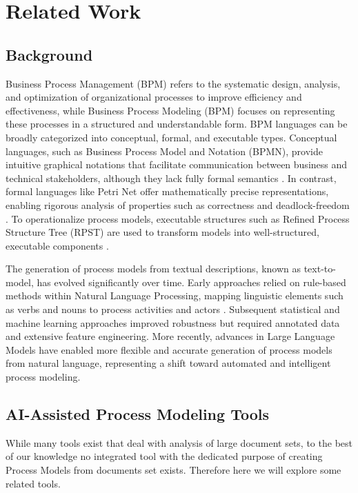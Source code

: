 \chapter{Related Work}
\label{sec:rel}
\section{Background}
Business Process Management (BPM) refers to the systematic design, analysis, and optimization of organizational processes to improve efficiency and effectiveness, while Business Process Modeling (BPM) focuses on representing these processes in a structured and understandable form. BPM languages can be broadly categorized into conceptual, formal, and executable types. Conceptual languages, such as Business Process Model and Notation (BPMN), provide intuitive graphical notations that facilitate communication between business and technical stakeholders, although they lack fully formal semantics \cite{omg2011bpmn}. In contrast, formal languages like Petri Net offer mathematically precise representations, enabling rigorous analysis of properties such as correctness and deadlock-freedom \cite{vanderAalst1998}. To operationalize process models, executable structures such as Refined Process Structure Tree (RPST) are used to transform models into well-structured, executable components \cite{vanhatalo2009rpst}.

The generation of process models from textual descriptions, known as text-to-model, has evolved significantly over time. Early approaches relied on rule-based methods within Natural Language Processing, mapping linguistic elements such as verbs and nouns to process activities and actors \cite{friedrich2011process}. Subsequent statistical and machine learning approaches improved robustness but required annotated data and extensive feature engineering. More recently, advances in Large Language Models have enabled more flexible and accurate generation of process models from natural language, representing a shift toward automated and intelligent process modeling.

\section{AI-Assisted Process Modeling Tools}
While many tools exist that deal with analysis of large document sets, to the best of our knowledge no integrated tool with the dedicated purpose of creating Process Models from documents set exists. Therefore here we will explore some related tools.

